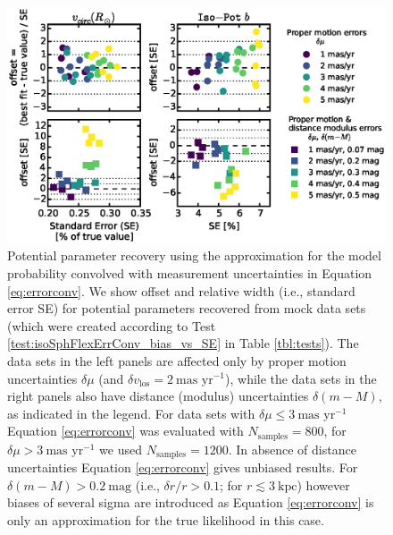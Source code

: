 
\begin{figure}[!htbp]
\centering
\includegraphics[width=\columnwidth]{figs/isoSphFlexErrConv_bias_vs_SE.eps}
\caption{Potential parameter recovery using the approximation for the model probability convolved with measurement uncertainties in Equation \ref{eq:errorconv}. We show  \pdf{} offset and relative width (i.e., standard error SE) for potential parameters recovered from mock data sets (which were created according to Test \ref{test:isoSphFlexErrConv_bias_vs_SE} in Table \ref{tbl:tests}). The data sets in the left panels are affected only by proper motion uncertainties $\delta \mu$ (and $\delta v_\text{los}=2~\text{mas yr}^{-1}$), while the data sets in the right panels also have distance (modulus) uncertainties $\delta (m-M)$, as indicated in the legend. For data sets with $\delta \mu \leq 3 ~\text{mas yr}^{-1}$ Equation \ref{eq:errorconv} was evaluated with $N_\text{samples}=800$, for $\delta \mu > 3~\text{mas yr}^{-1}$ we used $N_\text{samples}=1200$. In absence of distance uncertainties Equation \ref{eq:errorconv} gives unbiased results. For $\delta(m-M) > 0.2~\text{mag}$ (i.e., $\delta r/r > 0.1$; for $r \lesssim 3~\text{kpc}$) however biases of several sigma are introduced as Equation \ref{eq:errorconv} is only an approximation for the true likelihood in this case. }
\label{fig:isoSphFlexErrConv_bias_vs_SE}
\end{figure}





